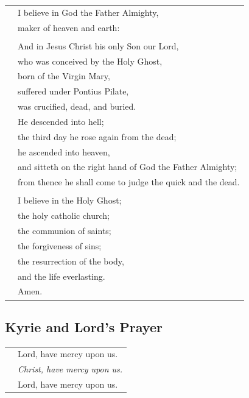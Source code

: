 \documentclass{article}
\begin{document}
\begin{tabularx}{\linewidth}{lX}

    & I believe in God the Father Almighty, \\
    & maker of heaven and earth: \\
    & \\
    & And in Jesus Christ his only Son our Lord, \\
    & who was conceived by the Holy Ghost, \\
    & born of the Virgin Mary, \\
    & suffered under Pontius Pilate, \\
    & was crucified, dead, and buried. \\
    & He descended into hell; \\
    & the third day he rose again from the dead; \\
    & he ascended into heaven, \\
    & and sitteth on the right hand of God the Father Almighty; \\
    & from thence he shall come to judge the quick and the dead. \\
    & \\
    & I believe in the Holy Ghost; \\
    & the holy catholic church; \\
    & the communion of saints; \\
    & the forgiveness of sins; \\
    & the resurrection of the body, \\
    & and the life everlasting. \\
    & Amen.


\end{tabularx}

\subsection*{Kyrie and Lord's Prayer}


\begin{tabularx}{\linewidth}{lX}

    & Lord, have mercy upon us. \\
    & \textit{Christ, have mercy upon us.} \\
    & Lord, have mercy upon us. \\
\end{tabularx}
\end{document}
